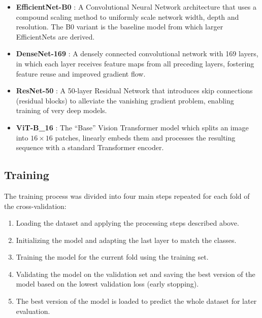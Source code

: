     \begin{itemize}
        \item \textbf{EfficientNet-B0} \autocite{tanEfficientNetRethinkingModel2019}:  
        A Convolutional Neural Network architecture that uses a compound scaling method to uniformly scale network width, depth and resolution.  
        The B0 variant is the baseline model from which larger EfficientNets are derived.  

        \item \textbf{DenseNet-169} \autocite{huangDenselyConnectedConvolutional2017}:  
        A densely connected convolutional network with 169 layers, in which each layer receives feature maps from all preceding layers, fostering feature reuse and improved gradient flow.  

        \item \textbf{ResNet-50} \autocite{heDeepResidualLearning2016}:  
        A 50-layer Residual Network that introduces skip connections (residual blocks) to alleviate the vanishing gradient problem, enabling training of very deep models.  

        \item \textbf{ViT-B\_16} \autocite{dosovitskiyImageWorth16x162021}:  
        The “Base” Vision Transformer model which splits an image into \(16\times 16\) patches, linearly embeds them and processes the resulting sequence with a standard Transformer encoder.  
    \end{itemize}

    \subsection{Training}
    The training process was divided into four main steps repeated for each fold of the cross-validation:
    \begin{enumerate}
        \item Loading the dataset and applying the processing steps described above.
        \item Initializing the model and adapting the last layer to match the classes.
        \item Training the model for the current fold using the training set.
        \item Validating the model on the validation set and saving the best version of the model based on the lowest validation loss (early stopping).
        \item The best version of the model is loaded to predict the whole dataset for later evaluation.
    \end{enumerate}

